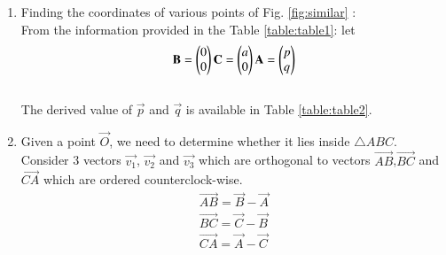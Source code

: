 \begin{enumerate}[label=\thesection.\arabic*.,ref=\thesection.\theenumi]
\item
Finding the coordinates of various points of Fig. \ref{fig:similar} :\\
From the information provided in the Table \ref{table:table1}: let\\
\begin{multline}
 \mathbf{B}= \begin{pmatrix}0\\0\end{pmatrix}
\mathbf{C}=\begin{pmatrix}a\\0\end{pmatrix}
\mathbf{A}=\begin{pmatrix}p\\q\end{pmatrix}
\end{multline}
    \\The derived value of $\vec{p}$ and $\vec{q}$ is available in Table \ref{table:table2}.
\item Given a point $\vec{O}$, we need to determine whether it lies inside $\triangle ABC$. Consider 3 vectors $\vec{v_1}$, $\vec{v_2}$ and $\vec{v_3}$ which are orthogonal to vectors $\vec{AB}$,$\vec{BC}$ and $\vec{CA}$ which are ordered counterclock-wise.
\begin{align}
\vec{AB} = \vec{B} - \vec{A} \\
\vec{BC} = \vec{C} - \vec{B}\\
\vec{CA} = \vec{A} - \vec{C}

\end{align}
\end{enumerate}
